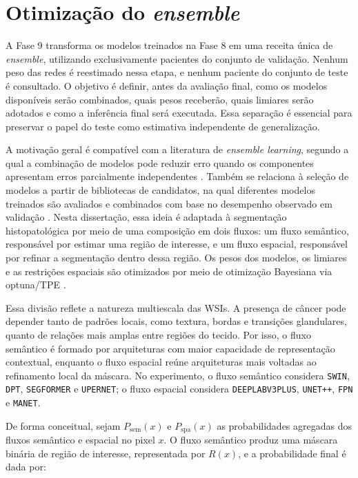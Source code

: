 \section{Otimização do \textit{ensemble}}\label{sec:met_otimizacao_ensemble}

A Fase 9 transforma os modelos treinados na Fase 8 em uma receita única de
\textit{ensemble}, utilizando exclusivamente pacientes do conjunto de validação.
Nenhum peso das redes é reestimado nessa etapa, e nenhum paciente do conjunto de
teste é consultado. O objetivo é definir, antes da avaliação final, como os
modelos disponíveis serão combinados, quais pesos receberão, quais limiares serão
adotados e como a inferência final será executada. Essa separação é essencial
para preservar o papel do teste como estimativa independente de generalização.

A motivação geral é compatível com a literatura de \textit{ensemble learning},
segundo a qual a combinação de modelos pode reduzir erro quando os componentes
apresentam erros parcialmente independentes \cite{dietterich2000ensemble}.
Também se relaciona à seleção de modelos a partir de bibliotecas de candidatos,
na qual diferentes modelos treinados são avaliados e combinados com base no
desempenho observado em validação \cite{caruana2004ensemble}. Nesta dissertação,
essa ideia é adaptada à segmentação histopatológica por meio de uma composição
em dois fluxos: um fluxo semântico, responsável por estimar uma região de
interesse, e um fluxo espacial, responsável por refinar a segmentação dentro
dessa região. Os pesos dos modelos, os limiares e as restrições espaciais são
otimizados por meio de otimização Bayesiana via optuna/TPE
\cite{akiba2019optuna,bergstra2011algorithms}.

Essa divisão reflete a natureza multiescala das WSIs. A presença de câncer pode
depender tanto de padrões locais, como textura, bordas e transições glandulares,
quanto de relações mais amplas entre regiões do tecido. Por isso, o fluxo
semântico é formado por arquiteturas com maior capacidade de representação
contextual, enquanto o fluxo espacial reúne arquiteturas mais voltadas ao
refinamento local da máscara. No experimento, o fluxo semântico considera
\texttt{SWIN}, \texttt{DPT}, \texttt{SEGFORMER} e \texttt{UPERNET}; o fluxo
espacial considera \texttt{DEEPLABV3PLUS}, \texttt{UNET++}, \texttt{FPN} e
\texttt{MANET}.

De forma conceitual, sejam $P_{\mathrm{sem}}(x)$ e $P_{\mathrm{spa}}(x)$ as
probabilidades agregadas dos fluxos semântico e espacial no pixel $x$. O fluxo
semântico produz uma máscara binária de região de interesse, representada por
$R(x)$, e a probabilidade final é dada por:

